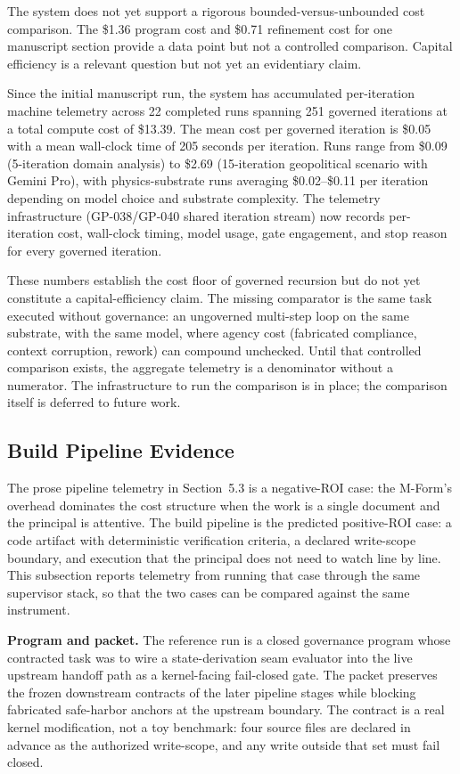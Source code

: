 \documentclass[11pt]{article}
\begin{document}
The system does not yet support a rigorous bounded-versus-unbounded cost comparison. The \$1.36 program cost and \$0.71 refinement cost for one manuscript section provide a data point but not a controlled comparison. Capital efficiency is a relevant question but not yet an evidentiary claim.

Since the initial manuscript run, the system has accumulated per-iteration machine telemetry across 22 completed runs spanning 251 governed iterations at a total compute cost of \$13.39. The mean cost per governed iteration is \$0.05 with a mean wall-clock time of 205 seconds per iteration. Runs range from \$0.09 (5-iteration domain analysis) to \$2.69 (15-iteration geopolitical scenario with Gemini Pro), with physics-substrate runs averaging \$0.02--\$0.11 per iteration depending on model choice and substrate complexity. The telemetry infrastructure (GP-038/GP-040 shared iteration stream) now records per-iteration cost, wall-clock timing, model usage, gate engagement, and stop reason for every governed iteration.

These numbers establish the cost floor of governed recursion but do not yet constitute a capital-efficiency claim. The missing comparator is the same task executed without governance: an ungoverned multi-step loop on the same substrate, with the same model, where agency cost (fabricated compliance, context corruption, rework) can compound unchecked. Until that controlled comparison exists, the aggregate telemetry is a denominator without a numerator. The infrastructure to run the comparison is in place; the comparison itself is deferred to future work.

\subsection{Build Pipeline Evidence}

The prose pipeline telemetry in Section~5.3 is a negative-ROI case: the M-Form's overhead dominates the cost structure when the work is a single document and the principal is attentive. The build pipeline is the predicted positive-ROI case: a code artifact with deterministic verification criteria, a declared write-scope boundary, and execution that the principal does not need to watch line by line. This subsection reports telemetry from running that case through the same supervisor stack, so that the two cases can be compared against the same instrument.

\textbf{Program and packet.} The reference run is a closed governance program whose contracted task was to wire a state-derivation seam evaluator into the live upstream handoff path as a kernel-facing fail-closed gate. The packet preserves the frozen downstream contracts of the later pipeline stages while blocking fabricated safe-harbor anchors at the upstream boundary. The contract is a real kernel modification, not a toy benchmark: four source files are declared in advance as the authorized write-scope, and any write outside that set must fail closed.
\end{document}
